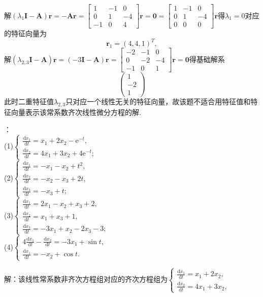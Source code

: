 \documentclass[12pt,UTF8]{ctexart}
\newcommand{\me}[0]{\mathrm e}
\newcommand{\dd}[2]{\frac{\mathrm d #1}{\mathrm d #2}}
\begin{document}
\begin{enumerate}
解$(\lambda_1\bm I-\bm A)\bm r=-\bm A\bm r=\begin{bmatrix}
1&-1&0\\
0&1&-4\\
-1&0&4
\end{bmatrix}\bm r=\bm 0=\begin{bmatrix}
1&-1&0\\
0&1&-4\\
0&0&0
\end{bmatrix}\bm r$得$\lambda_1=0$对应的特征向量为
\[\bm r_1=(4,4,1)^T,\]
解$(\lambda_{2,3}\bm I-\bm A)\bm r=(-3\bm I-\bm A)\bm r=\begin{bmatrix}
-2&-1&0\\
0&-2&-4\\
-1&0&1
\end{bmatrix}\bm r=\bm0$得基础解系
\[\begin{pmatrix}
1\\-2\\1
\end{pmatrix}\]
此时二重特征值$\lambda_{2,3}$只对应一个线性无关的特征向量，故该题不适合用特征值和特征向量表示该常系数齐次线性微分方程的解.

：\\
(1)$\begin{cases}
\dd{x_1}t=x_1+2x_2-\me^{-t},\\
\dd{x_2}t=4x_1+3x_2+4\me^{-t};
\end{cases}$\\
(2)$\begin{cases}
\dd{x_1}t=-x_1-x_2+t^2,\\
\dd{x_2}t=-x_2-x_3+2t,\\
\dd{x_3}t=-x_3+t;
\end{cases}$\\
(3)$\begin{cases}
\dd{x_1}t=2x_1-x_2+x_3+2,\\
\dd{x_2}t=x_1+x_3+1,\\
\dd{x_3}t=-3x_1+x_2-2x_3-3;
\end{cases}$\\
(4)$\begin{cases}
4\dd{x_1}t-\dd{x_2}t=-3x_1+\sin t,\\
\dd{x_1}t=-x_2+\cos t.
\end{cases}$

解：该线性常系数非齐次方程组对应的齐次方程组为$\begin{cases}
\dd{x_1}t=x_1+2x_2,\\
\dd{x_2}t=4x_1+3x_2,
\end{cases}$\\


\end{enumerate}
\end{document}
